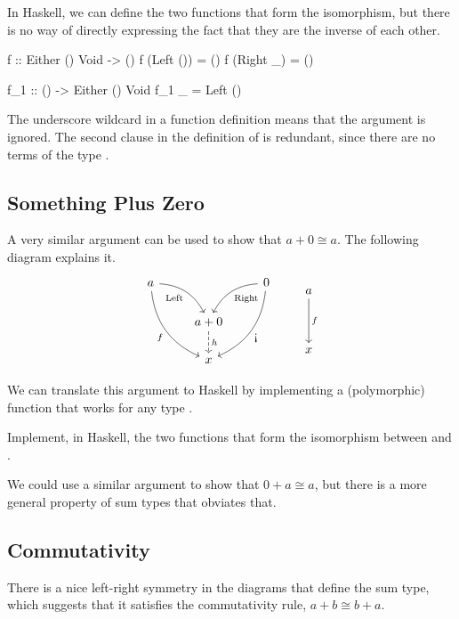 \documentclass[DaoFP]{subfiles}
\begin{document}
In Haskell, we can define the two functions that form the isomorphism, but there is no way of directly expressing the fact that they are the inverse of each other.
\begin{haskell}
f :: Either () Void -> ()
f (Left ()) = ()
f (Right _) = ()

f_1 :: () -> Either () Void
f_1 _ = Left ()
\end{haskell}
The underscore wildcard in a function definition means that the argument is ignored. The second clause in the definition of  is redundant, since there are no terms of the type . 

\subsection{Something Plus Zero}
A very similar argument can be used to show that $a + 0 \cong a$. The following diagram explains it.
\[
 \begin{tikzcd}
 a
 \arrow[dr,  bend left, "\text{Left}"']
 \arrow[ddr, bend right, "f"']
 && 0
 \arrow[dl, bend right, "\text{Right}"]
 \arrow[ddl, bend left, "\mbox{!`}"]
 \\
&a + 0
\arrow[d, dashed, "h"]
\\
& x
 \end{tikzcd}
 \qquad
 \begin{tikzcd}
 a
 \arrow[dd, "f"]
 \\
 \\
 x
 \end{tikzcd}
\]

We can translate this argument to Haskell by implementing a (polymorphic) function  that works for any type . 

\begin{exercise}
Implement, in Haskell, the two functions that form the isomorphism between  and .
\end{exercise}

We could use a similar argument to show that $0 + a \cong a$, but there is a more general property of sum types that obviates that.
\subsection{Commutativity}

There is a nice left-right symmetry in the diagrams that define the sum type, which suggests that it satisfies the commutativity rule, $a + b \cong b + a$. 
\end{document}
